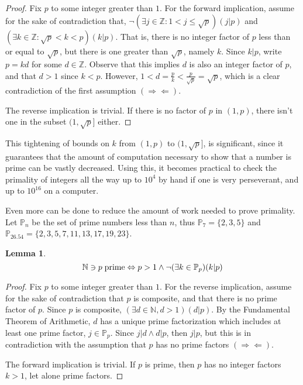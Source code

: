 \documentclass[10pt, oneside]{article}
\let\leq\leqslant
\newcommand{\Z}{\mathbb{Z}}
\newcommand{\N}{\mathbb{N}}
\renewcommand{\P}{\mathbb{P}} %
\newcommand{\contra}{(\Rightarrow\Leftarrow)}
\newtheorem{lem}{Lemma}
\begin{document}
\begin{proof}
    Fix $p$ to some integer greater than $1$. For the forward implication, assume for the sake of contradiction that, $\lnot(\exists j \in \Z: 1 < j \leq \sqrt{p})(j | p)$
    and $(\exists k \in \Z: \sqrt{p} < k < p) (k | p)$. That is, there is no integer factor of $p$ less than or equal to $\sqrt{p}$, but there is one greater than $\sqrt{p}$, namely $k$. Since $k|p$, write $p = kd$ for some $d \in \Z$. Observe that this implies $d$ is also an integer factor of $p$, and that $d > 1$ since $k < p$. However, $1 < d = \frac{p}{k} < \frac{p}{\sqrt{p}} = \sqrt{p}$, which is a clear contradiction of the first assumption $\contra$.
    
    The reverse implication is trivial. If there is no factor of $p$ in $(1,p)$, there isn't one in the subset $(1,\sqrt{p}]$ either.
\end{proof}

This tightening of bounds on $k$ from $(1,p)$ to $(1,\sqrt{p}]$, is significant, since it guarantees that the amount of computation necessary to show that a number is prime can be vastly decreased. Using this, it becomes practical to check the primality of integers all the way up to $10^4$ by hand if one is very perseverant, and up to $10^{16}$ on a computer.

Even more can be done to reduce the amount of work needed to prove primality. Let $\P_n$ be the set of prime numbers less than $n$, thus $\P_7 = \{2,3,5\}$ and $\P_{26.54} = \{2,3,5,7,11,13,17,19,23\}$.

\begin{lem}
    \[\N \ni p {\rm\;prime} \Leftrightarrow p > 1 \land \lnot(\exists k \in \P_p)(k|p)\]
\end{lem}
\begin{proof}
    Fix $p$ to some integer greater than $1$. For the reverse implication, assume for the sake of contradiction that $p$ is composite, and that there is no prime factor of $p$. Since $p$ is composite, $(\exists d \in \N, d > 1)(d|p)$. By the Fundamental Theorem of Arithmetic, $d$ has a unique prime factorization which includes at least one prime factor, $j \in \P_p$. Since $j|d \land d|p$, then $j|p$, but this is in contradiction with the assumption that $p$ has no prime factors $\contra$.
    
    The forward implication is trivial. If $p$ is prime, then $p$ has no integer factors $k > 1$, let alone prime factors.
\end{proof}
\end{document}
